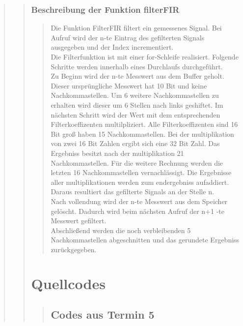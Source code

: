 \begin{quote}
\begin{quote}
    	\subsubsection{Beschreibung der Funktion filterFIR}
    	\begin{quote}
    	
    	Die Funktion FilterFIR filtert ein gemessenes Signal. Bei Aufruf wird der n-te Eintrag des gefilterten Signals
    	ausgegeben und der Index incrementiert.\\
    	Die Filterfunktion ist mit einer for-Schleife realisiert. Folgende Schritte werden innerhalb eines Durchlaufs
    	durchgeführt.\\
    	Zu Beginn wird der n-te Messwert aus dem Buffer geholt. Dieser ursprüngliche Messwert hat 10 Bit und keine
    	Nachkommastellen. Um 6 weitere Nachkommastellen zu erhalten wird dieser um 6 Stellen nach links geshiftet. Im
        nächsten Schritt wird der Wert mit dem entsprechenden Filterkoeffizenten multilpliziert. Alle Filterkoeffizenten
        sind 16 Bit groß haben 15 Nachkommastellen. Bei der multiplikation von zwei 16 Bit Zahlen ergibt sich eine 32
        Bit Zahl. Das Ergebniss besitzt nach der multiplikation 21 Nachkommastellen. Für die weitere Rechnung werden die
        letzten 16 Nachkommastellen vernachlässigt. Die Ergebnisse aller multiplikationen werden zum endergebniss
        aufaddiert. Daraus resultiert das gefilterte Signals an der Stelle n.\\
        Nach vollendung wird der n-te Messwert aus dem Speicher gelöscht. Dadurch wird beim nächsten Aufruf der n+1 -te
        Messwert gefiltert.\\
        Abschließend werden die noch verbleibenden 5 Nachkommastellen abgeschnitten und das gerundete Ergebniss
        zurückgegeben.
        
		
\end{quote}

\section{Quellcodes}
\begin{quote}

	\subsection{Codes aus Termin 5}
	\begin{quote}

\end{quote}
\end{quote}
\end{quote}
\end{quote}
